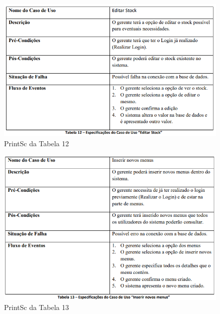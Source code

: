 \FloatBarrier
\begin{figure}[!hbt]
    \centering
    \includegraphics[width=14cm]{Resources/TablesPrintSc/12.png}
    \caption{PrintSc da Tabela 12}
    
\end{figure}
\FloatBarrier
\begin{figure}[!hbt]
    \centering
    \includegraphics[width=14cm]{Resources/TablesPrintSc/13.png}
    \caption{PrintSc da Tabela 13}
    
\end{figure}
\FloatBarrier
